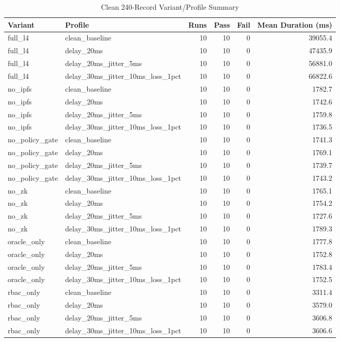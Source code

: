 \begin{table}[!t]
\centering
\caption{Clean 240-Record Variant/Profile Summary}
\label{tab:variant_summary}
\begin{adjustbox}{width=\textwidth}
\begin{tabular}{llrrrr}
\toprule
Variant & Profile & Runs & Pass & Fail & Mean Duration (ms) \\
\midrule
full\_l4 & clean\_baseline & 10 & 10 & 0 & 39055.4 \\
full\_l4 & delay\_20ms & 10 & 10 & 0 & 47435.9 \\
full\_l4 & delay\_20ms\_jitter\_5ms & 10 & 10 & 0 & 56881.0 \\
full\_l4 & delay\_30ms\_jitter\_10ms\_loss\_1pct & 10 & 10 & 0 & 66822.6 \\
no\_ipfs & clean\_baseline & 10 & 10 & 0 & 1782.7 \\
no\_ipfs & delay\_20ms & 10 & 10 & 0 & 1742.6 \\
no\_ipfs & delay\_20ms\_jitter\_5ms & 10 & 10 & 0 & 1759.8 \\
no\_ipfs & delay\_30ms\_jitter\_10ms\_loss\_1pct & 10 & 10 & 0 & 1736.5 \\
no\_policy\_gate & clean\_baseline & 10 & 10 & 0 & 1741.3 \\
no\_policy\_gate & delay\_20ms & 10 & 10 & 0 & 1769.1 \\
no\_policy\_gate & delay\_20ms\_jitter\_5ms & 10 & 10 & 0 & 1739.7 \\
no\_policy\_gate & delay\_30ms\_jitter\_10ms\_loss\_1pct & 10 & 10 & 0 & 1743.2 \\
no\_zk & clean\_baseline & 10 & 10 & 0 & 1765.1 \\
no\_zk & delay\_20ms & 10 & 10 & 0 & 1754.2 \\
no\_zk & delay\_20ms\_jitter\_5ms & 10 & 10 & 0 & 1727.6 \\
no\_zk & delay\_30ms\_jitter\_10ms\_loss\_1pct & 10 & 10 & 0 & 1789.3 \\
oracle\_only & clean\_baseline & 10 & 10 & 0 & 1777.8 \\
oracle\_only & delay\_20ms & 10 & 10 & 0 & 1752.8 \\
oracle\_only & delay\_20ms\_jitter\_5ms & 10 & 10 & 0 & 1783.4 \\
oracle\_only & delay\_30ms\_jitter\_10ms\_loss\_1pct & 10 & 10 & 0 & 1752.5 \\
rbac\_only & clean\_baseline & 10 & 10 & 0 & 3311.4 \\
rbac\_only & delay\_20ms & 10 & 10 & 0 & 3579.0 \\
rbac\_only & delay\_20ms\_jitter\_5ms & 10 & 10 & 0 & 3606.8 \\
rbac\_only & delay\_30ms\_jitter\_10ms\_loss\_1pct & 10 & 10 & 0 & 3606.6 \\
\bottomrule
\end{tabular}
\end{adjustbox}
\end{table}
